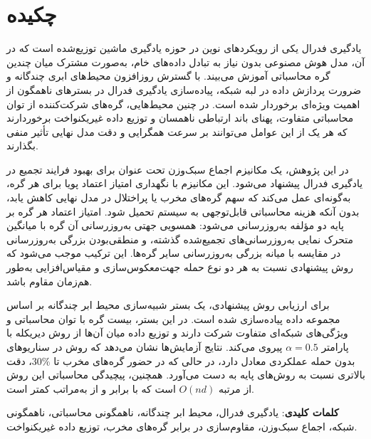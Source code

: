 \clearpage
\section*{چکیده}

یادگیری فدرال یکی از رویکردهای نوین در حوزه یادگیری ماشین توزیع‌شده است که در آن، مدل هوش مصنوعی بدون نیاز به تبادل داده‌های خام، به‌صورت مشترک میان چندین گره محاسباتی آموزش می‌بیند. با گسترش روزافزون محیط‌های ابری چندگانه و ضرورت پردازش داده در لبه شبکه، پیاده‌سازی یادگیری فدرال در بسترهای ناهمگون از اهمیت ویژه‌ای برخوردار شده است. در چنین محیط‌هایی، گره‌های شرکت‌کننده از توان محاسباتی متفاوت، پهنای باند ارتباطی ناهمسان و توزیع داده غیریکنواخت برخوردارند که هر یک از این عوامل می‌توانند بر سرعت همگرایی و دقت مدل نهایی تأثیر منفی بگذارند.

در این پژوهش، یک مکانیزم اجماع سبک‌وزن تحت عنوان  برای بهبود فرایند تجمیع در یادگیری فدرال پیشنهاد می‌شود. این مکانیزم با نگهداری امتیاز اعتماد پویا برای هر گره، به‌گونه‌ای عمل می‌کند که سهم گره‌های مخرب یا پراختلال در مدل نهایی کاهش یابد، بدون آنکه هزینه محاسباتی قابل‌توجهی به سیستم تحمیل شود. امتیاز اعتماد هر گره بر پایه دو مؤلفه به‌روزرسانی می‌شود: همسویی جهتی به‌روزرسانی آن گره با میانگین متحرک نمایی به‌روزرسانی‌های تجمیع‌شده گذشته، و منطقی‌بودن بزرگی به‌روزرسانی در مقایسه با میانه بزرگی به‌روزرسانی سایر گره‌ها. این ترکیب موجب می‌شود که روش پیشنهادی نسبت به هر دو نوع حمله جهت‌معکوس‌سازی و مقیاس‌افزایی به‌طور هم‌زمان مقاوم باشد.

برای ارزیابی روش پیشنهادی، یک بستر شبیه‌سازی محیط ابر چندگانه بر اساس مجموعه داده  پیاده‌سازی شده است. در این بستر، بیست گره با توان محاسباتی و ویژگی‌های شبکه‌ای متفاوت شرکت دارند و توزیع داده میان آن‌ها از روش دیریکله با پارامتر $\alpha = 0.5$ پیروی می‌کند. نتایج آزمایش‌ها نشان می‌دهد که روش  در سناریوهای بدون حمله عملکردی معادل  دارد، در حالی که در حضور گره‌های مخرب تا $30\%$، دقت بالاتری نسبت به روش‌های پایه به دست می‌آورد. همچنین، پیچیدگی محاسباتی این روش از مرتبه $O(nd)$ است که با  برابر و از  به‌مراتب کمتر است.

\vskip 5mm
\noindent\textbf{کلمات کلیدی}:
یادگیری فدرال، محیط ابر چندگانه، ناهمگونی محاسباتی، ناهمگونی شبکه، اجماع سبک‌وزن، مقاوم‌سازی در برابر گره‌های مخرب، توزیع داده غیریکنواخت.